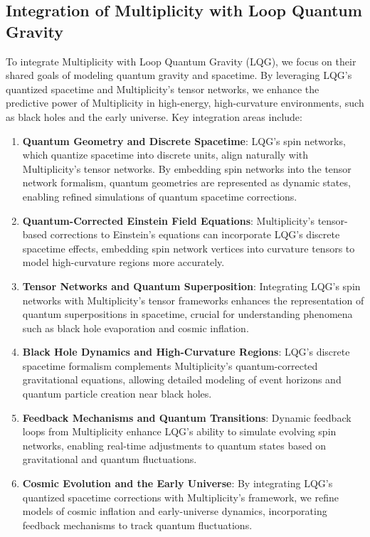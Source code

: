 \documentclass{article}
\theoremstyle{plain}
\begin{document}
\subsection{Integration of Multiplicity with Loop Quantum Gravity}
To integrate Multiplicity with Loop Quantum Gravity (LQG), we focus on their shared goals of modeling quantum gravity and spacetime. By leveraging LQG's quantized spacetime and Multiplicity's tensor networks, we enhance the predictive power of Multiplicity in high-energy, high-curvature environments, such as black holes and the early universe. Key integration areas include:
\begin{enumerate}
    \item \textbf{Quantum Geometry and Discrete Spacetime}: LQG's spin networks, which quantize spacetime into discrete units, align naturally with Multiplicity's tensor networks. By embedding spin networks into the tensor network formalism, quantum geometries are represented as dynamic states, enabling refined simulations of quantum spacetime corrections.
    \item \textbf{Quantum-Corrected Einstein Field Equations}: Multiplicity's tensor-based corrections to Einstein's equations can incorporate LQG's discrete spacetime effects, embedding spin network vertices into curvature tensors to model high-curvature regions more accurately.
    \item \textbf{Tensor Networks and Quantum Superposition}: Integrating LQG's spin networks with Multiplicity's tensor frameworks enhances the representation of quantum superpositions in spacetime, crucial for understanding phenomena such as black hole evaporation and cosmic inflation.
    \item \textbf{Black Hole Dynamics and High-Curvature Regions}: LQG's discrete spacetime formalism complements Multiplicity's quantum-corrected gravitational equations, allowing detailed modeling of event horizons and quantum particle creation near black holes.
    \item \textbf{Feedback Mechanisms and Quantum Transitions}: Dynamic feedback loops from Multiplicity enhance LQG's ability to simulate evolving spin networks, enabling real-time adjustments to quantum states based on gravitational and quantum fluctuations.
    \item \textbf{Cosmic Evolution and the Early Universe}: By integrating LQG's quantized spacetime corrections with Multiplicity's framework, we refine models of cosmic inflation and early-universe dynamics, incorporating feedback mechanisms to track quantum fluctuations.
\end{enumerate}
\end{document}
